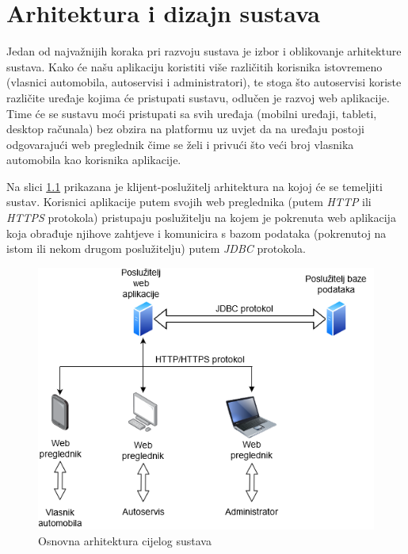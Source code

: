 \chapter{Arhitektura i dizajn sustava}
		
%
		
		Jedan od najvažnijih koraka pri razvoju sustava je izbor i oblikovanje arhitekture sustava. Kako će našu aplikaciju koristiti više različitih korisnika istovremeno (vlasnici automobila, autoservisi i administratori), te stoga što autoservisi koriste različite uređaje kojima će pristupati sustavu, odlučen je razvoj web aplikacije. Time će se sustavu moći pristupati sa svih uređaja (mobilni uređaji, tableti, desktop računala) bez obzira na platformu uz uvjet da na uređaju postoji odgovarajući web preglednik čime se želi i privući što veći broj vlasnika automobila kao korisnika aplikacije.
		
		Na slici \ref{fig:arhitektura1} prikazana je klijent-poslužitelj arhitektura na kojoj će se temeljiti sustav. Korisnici aplikacije putem svojih web preglednika (putem \textit{HTTP} ili \textit{HTTPS} protokola) pristupaju poslužitelju na kojem je pokrenuta web aplikacija koja obrađuje njihove zahtjeve i komunicira s bazom podataka (pokrenutoj na istom ili nekom drugom poslužitelju) putem \textit{JDBC} protokola.
		
		\begin{figure}[h]
			\centering
			\includegraphics[width=0.7\linewidth]{slike/server-client}
			\caption{Osnovna arhitektura cijelog sustava}
			\label{fig:arhitektura1}
		\end{figure}
	
